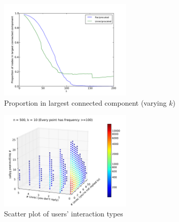 \documentclass[conference]{IEEEtran}
\begin{document}
\begin{figure}[!t]
\centering
\includegraphics[width=2.5in]{proportion_largestcc_k}
\caption{Proportion in largest connected component (varying $k$)}
\label{fig_rur_lcc_k}
\end{figure}


\begin{figure}[!t]
\centering
\includegraphics[width=2.5in]{scatter3}
\caption{Scatter plot of users' interaction types}
\label{fig_rur_sca2}
\end{figure}

%
%
\end{document}
